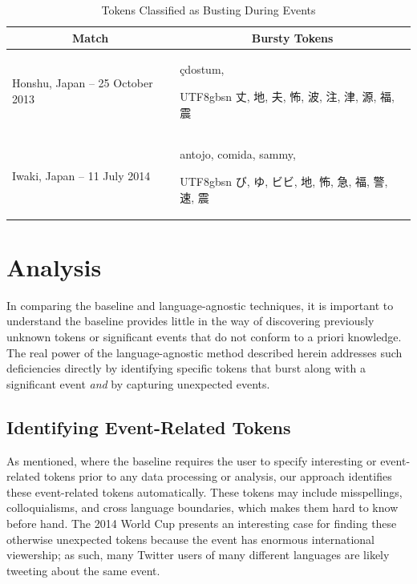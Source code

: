 \documentclass{acm_proc_article-sp}
\newcommand{\myfont}{gbsn}
\begin{document}
\begin{table}[htdp]
\caption{Tokens Classified as Busting During Events}
\begin{center}
\begin{tabular}{|p{1.45in} | p{1.45in} |}
\hline
\multicolumn{1}{|c|}{\textbf{Match}} & \multicolumn{1}{|c|}{\textbf{Bursty Tokens}} \\ \hline
Honshu, Japan -- 25 October 2013 & \c{c}dostum, \begin{CJK}{UTF8}{\myfont} 丈, 地, 夫, 怖, 波, 注, 津, 源, 福, 震 \end{CJK} \\ \hline
Iwaki, Japan -- 11 July 2014 & antojo, comida, sammy, \begin{CJK}{UTF8}{\myfont} び, ゆ, ビビ, 地, 怖, 急, 福, 警, 速, 震 \end{CJK} \\ \hline
\end{tabular}
\end{center}
\label{tab:japanTokens}
\end{table}

\section{Analysis}
\label{sect:analysis}

In comparing the baseline and language-agnostic techniques, it is important to understand the baseline provides little in the way of discovering previously unknown tokens or significant events that do not conform to a priori knowledge.
The real power of the language-agnostic method described herein addresses such deficiencies directly by identifying specific tokens that burst along with a significant event \emph{and} by capturing unexpected events.

\subsection{Identifying Event-Related Tokens}

As mentioned, where the baseline requires the user to specify interesting or event-related tokens prior to any data processing or analysis, our approach identifies these event-related tokens automatically.
These tokens may include misspellings, colloquialisms, and cross language boundaries, which makes them hard to know before hand.
The 2014 World Cup presents an interesting case for finding these otherwise unexpected tokens because the event has enormous international viewership; as such, many Twitter users of many different languages are likely tweeting about the same event.
\end{document}
